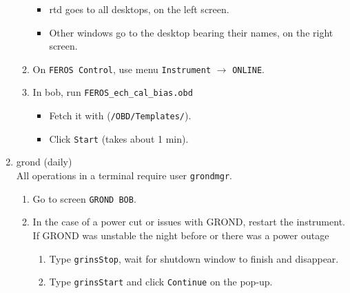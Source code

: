 \documentclass[11pt,fleqn]{book} %
\begin{document}
\begin{enumerate}
\begin{enumerate}
           \begin{itemize}
              \item \gls{rtd} goes to all desktops, on the left screen.
              \item Other windows go to the desktop bearing their names, on the right screen.
           \end{itemize}
         \item On \texttt{FEROS Control}, use menu \texttt{Instrument} $\rightarrow$ \texttt{ONLINE}.
         \item In \gls{bob}, run \texttt{FEROS\_ech\_cal\_bias.obd}
           \begin{itemize}
             \item Fetch it with \fetchob (\texttt{/OBD/Templates/}).
             \item Click \texttt{Start} (takes about 1 min).
           \end{itemize}
        \end{enumerate}
  \item \gls{grond} (daily)\\
        All operations in a terminal require user \texttt{grondmgr}. 
        \label{list:grond}
        \begin{enumerate}
         \item Go to screen \texttt{GROND BOB}.
         \item In the case of a power cut or issues with GROND, restart the instrument.\\ 
               If GROND was unstable the night before or there was a power outage %
         \begin{enumerate}
           \item Type \texttt{grinsStop}, wait for shutdown window to finish and disappear.\label{list:grinsstop}
            \item Type \texttt{grinsStart} and click \texttt{Continue} on the pop-up.

\end{enumerate}
\end{enumerate}
\end{enumerate}
\end{document}
